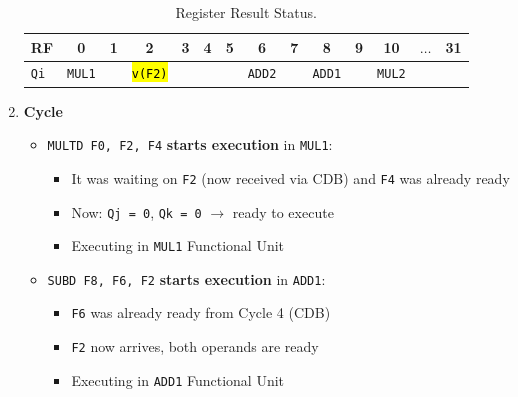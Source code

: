 \begin{enumerate}
    \begin{table}[!htp]
        \centering
        \begin{tabular}{@{} l | c c c c c c c c c c c c c @{}}
            \toprule
            RF              & 0                     & 1             & 2                     & 3             & 4             & 5             & 6                     & 7             & 8             & 9             & 10                    & $\dots$           & 31            \\
            \midrule
            \texttt{Qi}     & \texttt{MUL1}         &               & \hl{\texttt{v(F2)}}   &               &               &               & \texttt{ADD2}         &               & \texttt{ADD1} &               & \texttt{MUL2}         &                   &               \\
            \bottomrule
        \end{tabular}
        \caption*{Register Result Status.}
    \end{table}

    \newpage


    \item \textbf{Cycle \theenumi}
    \begin{itemize}
        \item \texttt{MULTD F0, F2, F4} \textbf{starts execution} in \texttt{MUL1}:
        \begin{itemize}
            \item It was waiting on \texttt{F2} (now received via CDB) and \texttt{F4} was already ready
            \item Now: \texttt{Qj = 0}, \texttt{Qk = 0} $\rightarrow$  ready to execute
            \item Executing in \texttt{MUL1} Functional Unit
        \end{itemize}
        \item \texttt{SUBD F8, F6, F2} \textbf{starts execution} in \texttt{ADD1}:
        \begin{itemize}
            \item \texttt{F6} was already ready from Cycle 4 (CDB)
            \item \texttt{F2} now arrives, both operands are ready
            \item Executing in \texttt{ADD1} Functional Unit
        \end{itemize}
    \end{itemize}


\end{enumerate}
